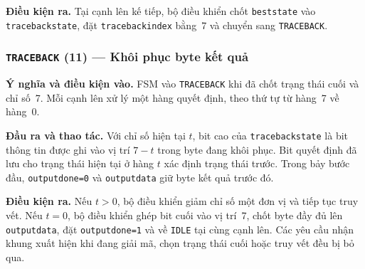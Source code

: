 \documentclass[12pt,a4paper]{article}
\renewcommand{\_}{\originalunderscore\allowbreak}
\begin{document}
\textbf{Điều kiện ra.} Tại cạnh lên kế tiếp, bộ điều khiển chốt \texttt{best\_state} vào \texttt{traceback\_state}, đặt \texttt{traceback\_index} bằng~7 và chuyển sang \texttt{TRACEBACK}.

\subsubsection{\texttt{TRACEBACK} (11) --- Khôi phục byte kết quả}\label{sec:control-traceback}
\textbf{Ý nghĩa và điều kiện vào.} FSM vào \texttt{TRACEBACK} khi đã chốt trạng thái cuối và chỉ số~7. Mỗi cạnh lên xử lý một hàng quyết định, theo thứ tự từ hàng~7 về hàng~0.

\textbf{Đầu ra và thao tác.} Với chỉ số hiện tại $t$, bit cao của \texttt{traceback\_state} là bit thông tin được ghi vào vị trí $7-t$ trong byte đang khôi phục. Bit quyết định đã lưu cho trạng thái hiện tại ở hàng $t$ xác định trạng thái trước. Trong bảy bước đầu, \texttt{output\_done=0} và \texttt{output\_data} giữ byte kết quả trước đó.

\textbf{Điều kiện ra.} Nếu $t>0$, bộ điều khiển giảm chỉ số một đơn vị và tiếp tục truy vết. Nếu $t=0$, bộ điều khiển ghép bit cuối vào vị trí~7, chốt byte đầy đủ lên \texttt{output\_data}, đặt \texttt{output\_done=1} và về \texttt{IDLE} tại cùng cạnh lên. Các yêu cầu nhận khung xuất hiện khi đang giải mã, chọn trạng thái cuối hoặc truy vết đều bị bỏ qua.
\end{document}
